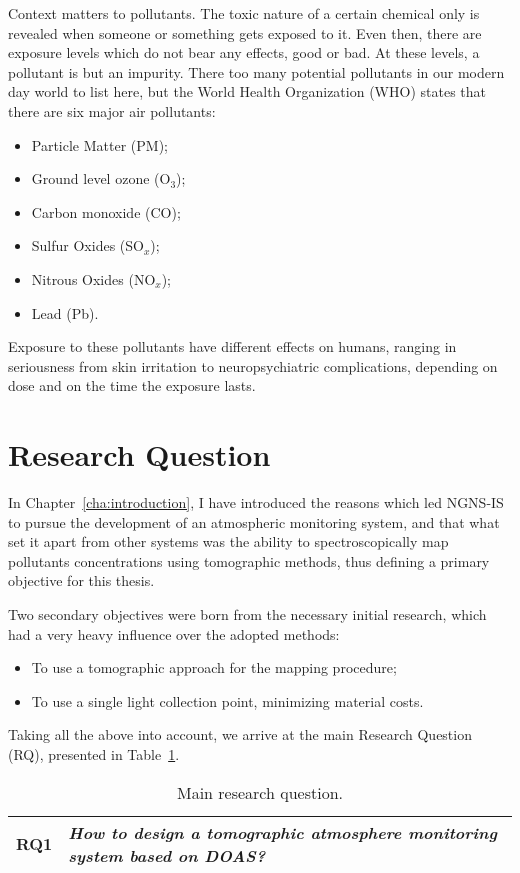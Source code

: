 Context matters to pollutants. The toxic nature of a certain chemical
only is revealed when someone or something gets exposed to it. Even
then, there are exposure levels which do not bear any effects, good or
bad. At these levels, a pollutant is but an impurity. There too many
potential pollutants in our modern day world to list here, but the World
Health Organization (\gls{WHO}) states that there are six major air
pollutants:
\begin{itemize}
    \item Particle Matter (\gls{PM});
    \item Ground level ozone (O$_3$);
    \item Carbon monoxide (CO);
    \item Sulfur Oxides (SO$_x$);
    \item Nitrous Oxides (NO$_x$);
    \item Lead (Pb).
\end{itemize}

Exposure to these pollutants have different effects on humans, ranging in
seriousness from skin irritation to neuropsychiatric complications,
depending on dose and on the time the exposure lasts.

\section{Research Question}%
\label{sec:research_question}

In Chapter~\ref{cha:introduction}, I have introduced the reasons which
led NGNS-IS to pursue the development of an atmospheric monitoring
system, and that what set it apart from other systems was the ability to
spectroscopically map pollutants concentrations using tomographic
methods, thus defining a primary objective for this thesis.

Two secondary objectives were born from the necessary initial research,
which had a very heavy influence over the adopted methods:
\begin{itemize}
    \item To use a tomographic approach for the mapping procedure;
    \item To use a single light collection point, minimizing material
        costs.
\end{itemize}

Taking all the above into account, we arrive at the main Research
Question (\gls{RQ}), presented in Table~\ref{tab:RQ1}.
\begin{table}[htpb]
    \centering
    \label{tab:RQ1}
    \caption{Main research question.}
    \begin{tabularx}{0.8\textwidth}{cX}
        \toprule
        \textbf{RQ1}&\emph{ How to design a tomographic atmosphere
        monitoring system based on DOAS? }\\
        \bottomrule
    \end{tabularx}
\end{table}


